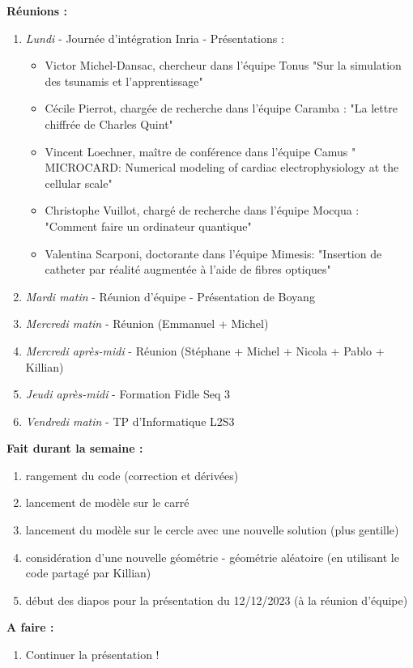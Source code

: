\textbf{Réunions :}
\begin{enumerate}[label=\textbullet]
	\item \textit{Lundi} - Journée d'intégration Inria - Présentations :
	\begin{itemize}
		\item Victor Michel-Dansac, chercheur dans l'équipe Tonus "Sur la simulation des tsunamis et l'apprentissage"
		\item Cécile Pierrot, chargée de recherche dans l'équipe Caramba : "La lettre chiffrée de Charles Quint"
		\item Vincent Loechner, maître de conférence dans l'équipe Camus " MICROCARD: Numerical modeling of cardiac electrophysiology at the cellular scale"
		\item Christophe Vuillot, chargé de recherche dans l'équipe Mocqua : "Comment faire un ordinateur quantique"
		\item Valentina Scarponi, doctorante dans l'équipe Mimesis: "Insertion de catheter par réalité augmentée à l'aide de fibres optiques"
	\end{itemize}
	\item \textit{Mardi matin} - Réunion d'équipe - Présentation de Boyang
	\item \textit{Mercredi matin} - Réunion (Emmanuel + Michel)
	\item \textit{Mercredi après-midi} - Réunion (Stéphane + Michel + Nicola + Pablo + Killian)
	\item \textit{Jeudi après-midi} - Formation Fidle Seq 3
	\item \textit{Vendredi matin} - TP d'Informatique L2S3
\end{enumerate}
\textbf{Fait durant la semaine :}
\begin{enumerate}[label=\textbullet]
	\item rangement du code (correction et dérivées)
	\item lancement de modèle sur le carré
	\item lancement du modèle sur le cercle avec une nouvelle solution (plus gentille)
	\item considération d'une nouvelle géométrie - géométrie aléatoire (en utilisant le code partagé par Killian)
	\item début des diapos pour la présentation du 12/12/2023 (à la réunion d'équipe)
\end{enumerate}
\textbf{A faire :}
\begin{enumerate}[label=\textbullet]
	\item Continuer la présentation !
\end{enumerate}